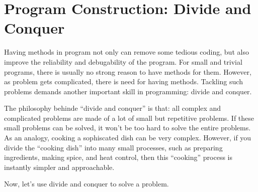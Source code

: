 \documentclass[../main.tex]{subfiles}
\begin{document}
    \section{Program Construction: Divide and Conquer}
    Having methods in program not only can remove some tedious coding, but also
    improve the reliability and debugability of the program. For small and trivial
    programs, there is usually no strong reason to have methods for them. However,
    as problem gets complicated, there is need for having methods. Tackling such
    problems demands another important skill in programming: divide and conquer.

    The philosophy behinde ``divide and conquer'' is that: all complex and
    complicated problems are made of a lot of small but repetitive problems. If
    these small problems can be solved, it won't be too hard to solve the entire
    problems. As an analogy, cooking a sophiscated dish can be very complex.
    However, if you divide the ``cooking dish'' into many small processes, such
    as preparing ingredients, making spice, and heat control, then this ``cooking''
    process is instantly simpler and approachable.

    Now, let's use divide and conquer to solve a problem.
\end{document}
